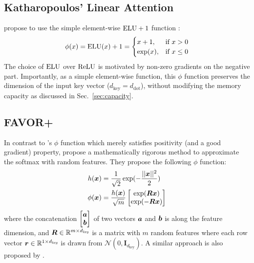 \documentclass{article}
\theoremstyle{definition}
\begin{document}
\subsection{Katharopoulos' Linear Attention}
\label{sec:katharopoulos}
\citet{katharopoulos2020transformers} propose to use the simple element-wise $\mathrm{ELU} + 1$ function \citep{clevert2015fast}:
\begin{align}
    \phi(x) = \mathrm{ELU}(x) + 1= 
    \begin{cases}
        x+1,& \text{if } x > 0\\
        \exp(x), & \text{if } x \leq 0
    \end{cases}
\end{align}
The choice of $\mathrm{ELU}$ over $\mathrm{ReLU}$ is motivated by non-zero gradients on the negative part.
Importantly, as a simple element-wise function,
this $\phi$ function preserves the dimension of the input key vector ($d_\text{key}=d_\text{dot}$),
without modifying the memory capacity
as discussed in Sec.~\ref{sec:capacity}.

\subsection{FAVOR+}
\label{sec:performer}
In contrast to \citet{katharopoulos2020transformers}'s $\phi$ function 
which merely satisfies positivity (and a good gradient) property,
\citet{choromanski2020rethinking} propose a mathematically rigorous method
to approximate the softmax with random features.
They propose the following $\phi$ function:
\begin{align}
    h({\bm{x}}) &= \frac{1}{\sqrt{2}} \exp(-\frac{||{\bm{x}}||^2}{2}) \\
    \phi({\bm{x}}) &= \frac{h({\bm{x}})}{\sqrt{m}}
    \begin{bmatrix}\exp({\bm{R}} {\bm{x}}) \\ \exp(-{\bm{R}} {\bm{x}}) \end{bmatrix} \label{eq:performer}
\end{align} 
where the concatenation $\begin{bmatrix}{\bm{a}} \\ {\bm{b}} \end{bmatrix}$ of two vectors ${\bm{a}}$ and ${\bm{b}}$ is along the feature dimension, and ${\bm{R}} \in \mathbb{R}^{m \times d_\textit{key}}$ is a matrix with $m$ random features where each row vector ${\bm{r}} \in \mathbb{R}^{1 \times d_\textit{key}}$ is drawn from $\mathcal{N}(0,\mathbf{I}_{d_\text{key}})$.
A similar approach is also proposed by \citet{peng2021random}.
\end{document}
